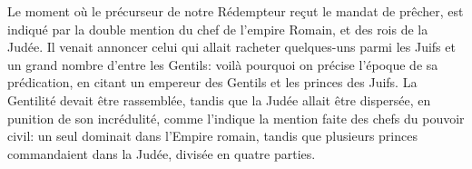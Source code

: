 Le moment où le précurseur de notre Rédempteur reçut le mandat de prêcher,
	est indiqué par la double mention du chef de l’empire Romain,
		et des rois de la Judée.
Il venait annoncer celui qui allait racheter quelques-uns parmi les Juifs
	et un grand nombre d’entre les Gentils:
	voilà pourquoi on précise l’époque de sa prédication,
	en citant un empereur des Gentils et les princes des Juifs.
La Gentilité devait être rassemblée,
	tandis que la Judée allait être dispersée, en punition de son incrédulité,
	comme l’indique la mention faite des chefs du pouvoir civil:
	un seul dominait dans l’Empire romain,
	tandis que plusieurs princes commandaient dans la Judée,
	divisée en quatre parties.
